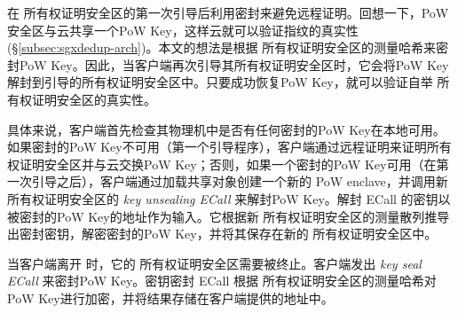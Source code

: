 \sysnameS 在 所有权证明安全区的第一次引导后利用密封来避免远程证明。回想一下，PoW 安全区与云共享一个PoW Key，这样云就可以验证指纹的真实性 (\S\ref{subsec:sgxdedup-arch})。本文的想法是根据 所有权证明安全区的测量哈希来密封PoW Key。因此，当客户端再次引导其所有权证明安全区时，它会将PoW Key解封到引导的所有权证明安全区中。只要成功恢复PoW Key，就可以验证自举 所有权证明安全区的真实性。

具体来说，客户端首先检查其物理机中是否有任何密封的PoW Key在本地可用。如果密封的PoW Key不可用（第一个引导程序），客户端通过远程证明来证明所有权证明安全区并与云交换PoW Key；否则，如果一个密封的PoW Key可用（在第一次引导之后），客户端通过加载共享对象创建一个新的 PoW enclave，并调用新 所有权证明安全区的 \textit{ key unsealing ECall} 来解封PoW Key。解封 ECall 的密钥以被密封的PoW Key的地址作为输入。它根据新 所有权证明安全区的测量散列推导出密封密钥，解密密封的PoW Key，并将其保存在新的 所有权证明安全区中。

当客户端离开 \sysnameS 时，它​​的 所有权证明安全区需要被终止。客户端发出 \textit{ key seal ECall} 来密封PoW Key。密钥密封 ECall 根据 所有权证明安全区的测量哈希对PoW Key进行加密，并将结果存储在客户端提供的地址中。
